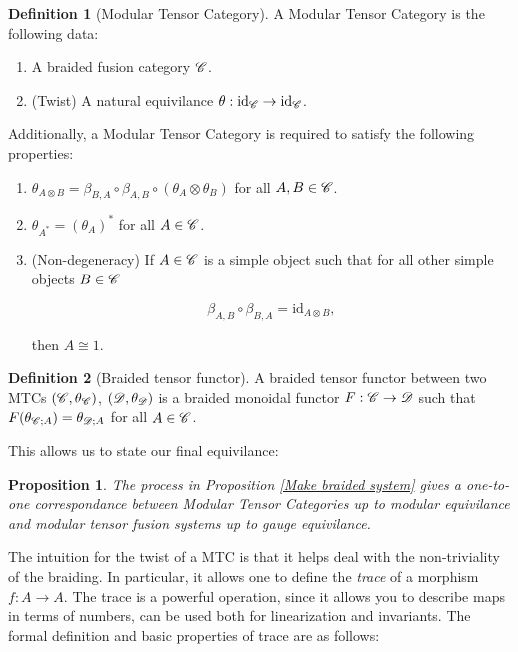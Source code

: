 \documentclass{article}
\newtheorem{proposition}{Proposition}[section]
\theoremstyle{definition}
\newtheorem*{definition}{Definition}
\numberwithin{figure}{section}
\begin{document}
\begin{definition}[Modular Tensor Category] A Modular Tensor Category is the following data:

\begin{enumerate}
\item A braided fusion category $\mathscr{C}$.
\item (Twist) A natural equivilance $\theta:\mathrm{id}_{\mathscr{C}} \to \mathrm{id}_{\mathscr{C}}$.
\end{enumerate}

Additionally, a Modular Tensor Category is required to satisfy the following properties:

\begin{enumerate}
\item $\theta_{A\otimes B}=\beta_{B,A}\circ \beta_{A,B}\circ (\theta_{A}\otimes \theta_{B})$ for all $A,B\in \mathscr{C}$.
\item $\theta_{A^*}=\left(\theta_A\right)^*$ for all $A\in \mathscr{C}$.
\item (Non-degeneracy) If $A\in \mathscr{C}$ is a simple object such that for all other simple objects $B\in \mathscr{C}$

$$\beta_{A,B}\circ \beta_{B,A}=\mathrm{id}_{A\otimes B},$$

then $A\cong 1$.
\end{enumerate}
\raggedleft\qedsymbol{}
\end{definition}

\begin{definition}[Braided tensor functor]  A braided tensor functor between two MTCs $(\mathscr{C},\theta_{\mathscr{C}})$, $(\mathscr{D},\theta_{\mathscr{D}})$ is a braided monoidal functor $F:\mathscr{C}\to \mathscr{D}$ such that $F(\theta_{\mathscr{C};A})=\theta_{\mathscr{D};A}$ for all $A\in \mathscr{C}$.

\raggedleft\qedsymbol{}
\end{definition}

This allows us to state our final equivilance:

\begin{proposition} The process in Proposition \ref{Make braided system} gives a one-to-one correspondance between Modular Tensor Categories up to modular equivilance and modular tensor fusion systems up to gauge equivilance.
\end{proposition}

The intuition for the twist of a MTC is that it helps deal with the non-triviality of the braiding. In particular, it allows one to define the \textit{trace} of a morphism $f:A \to A$. The trace is a powerful operation, since it allows you to describe maps in terms of numbers, can be used both for linearization and invariants. The formal definition and basic properties of trace are as follows:
\end{document}
